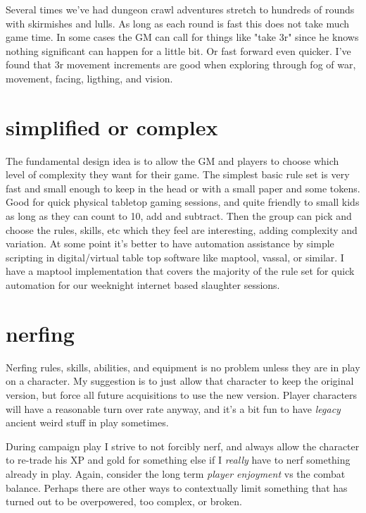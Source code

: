 Several times we've had dungeon crawl adventures stretch to hundreds of rounds with skirmishes and lulls. As long as each round is fast this does not take much game time. In some cases the GM can call for things like "take 3r" since he knows nothing significant can happen for a little bit. Or fast forward even quicker. I've found that 3r movement increments are good when exploring through fog of war, movement, facing, ligthing, and vision.


\section*{simplified or complex}
The fundamental design idea is to allow the GM and players to choose which level of complexity they want for their game. The simplest basic rule set is very fast and small enough to keep in the head or with a small paper and some tokens. Good for quick physical tabletop gaming sessions, and quite friendly to small kids as long as they can count to 10, add and subtract. Then the group can pick and choose the rules, skills, etc which they feel are interesting, adding complexity and variation. At some point it's better to have automation assistance by simple scripting in digital/virtual table top software like maptool, vassal, or similar. I have a maptool implementation that covers the majority of the rule set for quick automation for our weeknight internet based slaughter sessions.


\section*{nerfing}
Nerfing rules, skills, abilities, and equipment is no problem unless they are in play on a character. My suggestion is to just allow that character to keep the original version, but force all future acquisitions to use the new version. Player characters will have a reasonable turn over rate anyway, and it's a bit fun to have \emph{legacy} ancient weird stuff in play sometimes.

During campaign play I strive to not forcibly nerf, and always allow the character to re-trade his XP and gold for something else if I \emph{really} have to nerf something already in play. Again, consider the long term \emph{player enjoyment} vs the combat balance. Perhaps there are other ways to contextually limit something that has turned out to be overpowered, too complex, or broken.


